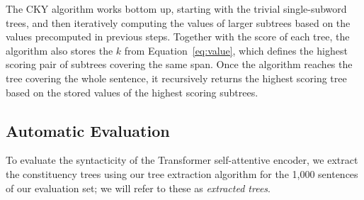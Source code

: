 \documentclass[11pt,a4paper]{article}
\def\RR#1{{\color{blue}RR: \it #1}}
\def\JL#1{{\color{magenta}JL: \it #1}}
\def\JLrepl#1#2{{\color{magenta}JL: \sout{#1} \it #2}}
\def\DEL#1{{\color{green}SMAZAT: \it #1}}
\def\JL#1{}
\def\JLrepl#1#2{}
\def\RR#1{}
\def\DEL#1{}
\begin{document}
The CKY algorithm works bottom up, starting with the trivial single-subword trees, and then iteratively computing the values of larger subtrees based on the values precomputed in previous steps. Together with the score of each tree, the algorithm also stores the $k$ from Equation~\ref{eq:value}, which defines the highest scoring pair of subtrees covering the same span.
Once the algorithm reaches the tree covering the whole sentence, it recursively returns the highest scoring tree based on the stored values of the highest scoring subtrees.

\RR{Tady je zakomentovanej původní popis, ten můj mi přijde lepší, ale asi taky neni dokonalej, a nejlepší by byl nějakej merge těch dvou.}


\subsection{Automatic Evaluation}
\label{sec:eval}

To evaluate the syntacticity of the Transformer self-attentive encoder,
we extract the constituency trees using our tree extraction algorithm for the 1,000 sentences of our evaluation set;
\DEL{, using all the 6 translation directions;} we will refer to these as \emph{extracted trees}.
\end{document}
